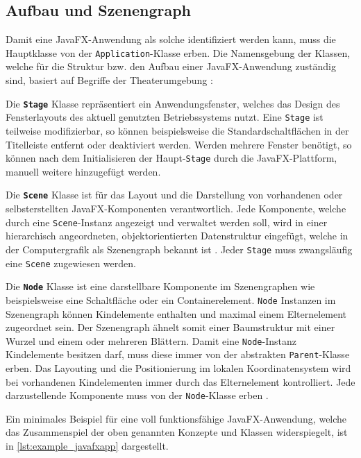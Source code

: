 \subsection{Aufbau und Szenengraph}
\label{javafx_szenengraph}
Damit eine JavaFX-Anwendung als solche identifiziert werden kann, muss die Hauptklasse von der \texttt{Application}-Klasse erben. Die Namensgebung der Klassen, welche für die Struktur bzw. den Aufbau einer JavaFX-Anwendung zuständig sind, basiert auf Begriffe der Theaterumgebung \cite{Anderson2019}:
\begin{description}
	\item Die \textbf{\texttt{Stage}} Klasse repräsentiert ein Anwendungsfenster, welches das Design des Fensterlayouts des aktuell genutzten Betriebssystems nutzt. Eine \texttt{Stage} ist teilweise modifizierbar, so können beispielsweise die Standardschaltflächen in der Titelleiste entfernt oder deaktiviert werden. Werden mehrere Fenster benötigt, so können nach dem Initialisieren der Haupt-\texttt{Stage} durch die JavaFX-Plattform, manuell weitere hinzugefügt werden.
	\item Die \textbf{\texttt{Scene}} Klasse ist für das Layout und die Darstellung von vorhandenen oder selbsterstellten JavaFX-Komponenten verantwortlich. Jede Komponente, welche durch eine \texttt{Scene}-Instanz angezeigt und verwaltet werden soll, wird in einer hierarchisch angeordneten, objektorientierten Datenstruktur eingefügt, welche in der Computergrafik als Szenengraph bekannt ist \cite{Hughes2013}. Jeder \texttt{Stage} muss zwangsläufig eine \texttt{Scene} zugewiesen werden.
	\item Die \textbf{\texttt{Node}} Klasse ist eine darstellbare Komponente im Szenengraphen wie beispielsweise eine Schaltfläche oder ein Containerelement. \texttt{Node} Instanzen im Szenengraph können Kindelemente enthalten und maximal einem Elternelement zugeordnet sein. Der Szenengraph ähnelt somit einer Baumstruktur mit einer Wurzel und einem oder mehreren Blättern. Damit eine \texttt{Node}-Instanz Kindelemente besitzen darf, muss diese immer von der abstrakten \texttt{Parent}-Klasse erben. Das Layouting und die Positionierung im lokalen Koordinatensystem wird bei vorhandenen Kindelementen immer durch das Elternelement kontrolliert. Jede darzustellende Komponente muss von der \texttt{Node}-Klasse erben \cite{Juneau2013}.
\end{description}
Ein minimales Beispiel für eine voll funktionsfähige JavaFX-Anwendung, welche das Zusammenspiel der oben genannten Konzepte und Klassen widerspiegelt, ist in \autoref{lst:example_javafxapp} dargestellt.\\

